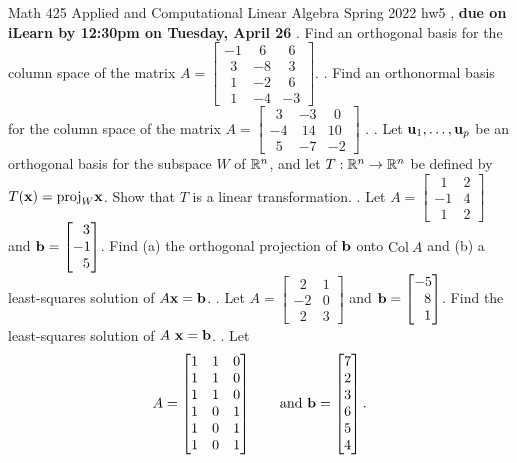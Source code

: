 \documentclass[12pt]{article}
\begin{document}
\noindent
Math 425 \qquad 
Applied and Computational Linear Algebra \qquad
Spring 2022
\vskip 5pt
\noindent
hw5 ,  {\bf due on iLearn by 12:30pm on Tuesday, April 26}
\vskip 10pt
. Find an orthogonal basis for the column space of the matrix $ A = \begin{bmatrix} -1 & ~~6 & ~~6\\~~3 & -8 & ~~3\\~~1 & -2 & ~~6\\~~1 & -4 & -3\end{bmatrix}$.
\vskip 10pt
. Find an orthonormal basis for the column space of the matrix $ A = \begin{bmatrix}~~3 & -3 &~~0\\-4 & ~14 & 10\\~~5 & -7 & -2\end{bmatrix}$ .
\vskip 10pt
.  Let ${\bf u}_1,\ldots, {\bf u}_p$ be an orthogonal basis for the subspace $W$ of ${\Bbb R}^n$, 
and let $T: {\Bbb R}^n \rightarrow {\Bbb R}^n$ be defined by $ T({\bf x}) = \text{proj}_W {\bf x}$. Show that $T$ is a linear transformation.
\vskip 10pt
. Let $A = \begin{bmatrix}~~1 & 2\\-1 & 4\\~~1 & 2\end{bmatrix}$ and ${\bf b} = \begin{bmatrix} ~~3\\ -1\\~~5\end{bmatrix}$.
Find (a) the orthogonal projection of ${\bf b}$ onto $\text{Col}~A$ and (b) a least-squares solution of
$A{\bf x} = {\bf b}$.
\vskip 10pt
. Let $A = \begin{bmatrix}~~2 & 1\\-2 & 0\\~~2 & 3\end{bmatrix}$ and ${\bf b} = \begin{bmatrix}-5\\~~8\\~~1\end{bmatrix}$. Find the least-squares solution of $A~{\bf x} = {\bf b}$.
\vskip 10pt
. Let 
\[
A = \begin{bmatrix}1 & 1 & 0\\1 & 1 & 0\\1 & 1 & 0\\ 1 & 0 & 1\\ 1 & 0 & 1 \\1 & 0 & 1 \end{bmatrix} \hskip 20pt \text{and } {\bf b} = \begin{bmatrix} 7\\ 2\\3\\6\\5\\4\end{bmatrix}.
\]
\end{document}
